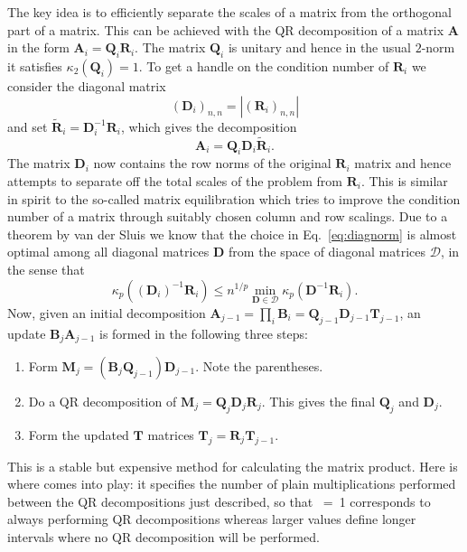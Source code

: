 The key idea is to efficiently separate the scales of a matrix from the orthogonal part of a matrix.
This can be achieved with the QR decomposition of a matrix $\bm{A}$ in the form $\bm{A}_i = \bm{Q}_i \bm{R}_i$. The matrix $\bm{Q}_i$ is unitary and hence in the usual $2$-norm it satisfies $\kappa_2(\bm{Q}_i) = 1$.
To get a handle on the condition number of $\bm{R}_i$ we consider the
diagonal matrix
\begin{equation}
(\bm{D}_i)_{n,n} = |(\bm{R}_i)_{n,n}|
\label{eq:diagnorm}
\end{equation}
and set $\tilde{\bm{R}}_i = \bm{D}_i^{-1} \bm{R}_i$, which gives the decomposition
\begin{equation}
\bm{A}_i = \bm{Q}_i \bm{D}_i \tilde{\bm{R}}_i.
\end{equation}
The matrix $\bm{D}_i$ now contains the row norms of the original $\bm{R}_i$ matrix and hence attempts to separate off the total scales of the problem from $\bm{R}_i$.
This is similar in spirit to the so-called matrix equilibration which tries to improve the condition number of a matrix through suitably chosen column and row scalings.
Due to a theorem by van der Sluis \cite{vanderSluis1969} we know that the choice in Eq.~\eqref{eq:diagnorm} is almost optimal among all diagonal matrices $\bm{D}$ from the space of diagonal matrices $\mathcal{D}$, in the sense that
\begin{equation*}
\kappa_p((\bm{D}_i)^{-1} \bm{R}_i ) \leq n^{1/p} \min_{\bm{D} \in \mathcal{D}} \kappa_p(\bm{D}^{-1} \bm{R}_i).
\end{equation*}
Now, given an initial decomposition $\bm{A}_{j-1} = \prod_i \mathcal{\bm{B}}_i = \bm{Q}_{j-1} \bm{D}_{j-1} \bm{T}_{j-1}$, an update
$\mathcal{\bm{B}}_j \bm{A}_{j-1}$ is formed in the following three steps:
\begin{enumerate}
\item Form $ \bm{M}_j = (\mathcal{\bm{B}}_j \bm{Q}_{j-1}) \bm{D}_{j-1}$. Note the parentheses.
\item Do a QR decomposition of $\bm{M}_j = \bm{Q}_j \bm{D}_j \bm{R}_j$. This gives the final $\bm{Q}_j$ and $\bm{D}_j$.
\item Form the updated $\bm{T}$ matrices $\bm{T}_j = \bm{R}_j \bm{T}_{j-1}$.
\end{enumerate}
This is a stable but expensive method for calculating the matrix product. Here is where  comes into play: it specifies 
the number of plain multiplications performed between the QR decompositions just described, so that ~=~1 corresponds to always performing QR decompositions whereas larger values define longer intervals where no QR decomposition will be performed.
